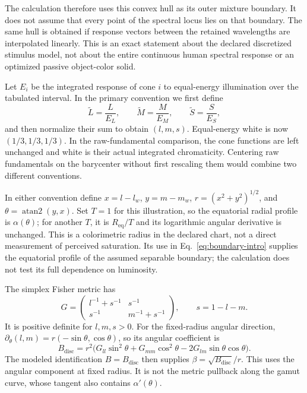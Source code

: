 \documentclass[11pt,letterpaper]{article}
\theoremstyle{plain}
\begin{document}
The calculation therefore uses this convex hull as its outer mixture boundary. It does not assume that every point of the spectral locus lies on that boundary. The same hull is obtained if response vectors between the retained wavelengths are interpolated linearly. This is an exact statement about the declared discretized stimulus model, not about the entire continuous human spectral response or an optimized passive object-color solid.

Let $E_i$ be the integrated response of cone $i$ to equal-energy illumination over the tabulated interval. In the primary convention we first define
\begin{equation}
 \widetilde L=\frac{L}{E_L},\qquad
 \widetilde M=\frac{M}{E_M},\qquad
 \widetilde S=\frac{S}{E_S},
 \label{eq:white-balance}
\end{equation}
and then normalize their sum to obtain $(l,m,s)$. Equal-energy white is now $(1/3,1/3,1/3)$. In the raw-fundamental comparison, the cone functions are left unchanged and white is their actual integrated chromaticity. Centering raw fundamentals on the barycenter without first rescaling them would combine two different conventions.

In either convention define $x=l-l_w$, $y=m-m_w$, $r=(x^2+y^2)^{1/2}$, and $\theta=\operatorname{atan2}(y,x)$. Set $T=1$ for this illustration, so the equatorial radial profile is $\alpha(\theta)$; for another $T$, it is $R_{\mathrm{eq}}/T$ and its logarithmic angular derivative is unchanged. This is a colorimetric radius in the declared chart, not a direct measurement of perceived saturation. Its use in Eq.~\eqref{eq:boundary-intro} supplies the equatorial profile of the assumed separable boundary; the calculation does not test its full dependence on luminosity.

The simplex Fisher metric \cite{Rao1945,Amari2016} has
\begin{equation}
 G=\begin{pmatrix}l^{-1}+s^{-1}&s^{-1}\\s^{-1}&m^{-1}+s^{-1}\end{pmatrix},
 \qquad s=1-l-m.
 \label{eq:fisher}
\end{equation}
It is positive definite for $l,m,s>0$. For the fixed-radius angular direction, $\partial_\theta(l,m)=r(-\sin\theta,\cos\theta)$, so its angular coefficient is
\begin{equation}
 B_{\mathrm{disc}}=r^2\bigl(G_{ll}\sin^2\theta+G_{mm}\cos^2\theta
                    -2G_{lm}\sin\theta\cos\theta\bigr).
 \label{eq:angular-fisher}
\end{equation}
The modeled identification $B=B_{\mathrm{disc}}$ then supplies $\beta=\sqrt{B_{\mathrm{disc}}}/r$. This uses the angular component at fixed radius. It is not the metric pullback along the gamut curve, whose tangent also contains $\alpha'(\theta)$.
\end{document}
